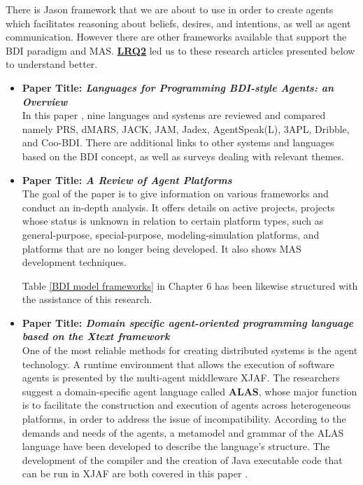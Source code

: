 \vspace{.5cm}

There is Jason framework that we are about to use in order to create agents which facilitates reasoning about beliefs, desires, and intentions, as well as agent communication. However there are other frameworks available that support the \ac{BDI} paradigm and \ac{MAS}. \hyperref[LRQ2.]{\textbf{LRQ2}} led us to these research articles presented below to understand better.

\newpage

\begin{itemize}[label={}]

\item \textbf{Paper Title: \textit{Languages for Programming \ac{BDI}-style Agents: an Overview}}\\

In this paper \cite{9lang}, nine languages and systems are reviewed and compared namely PRS, dMARS, JACK, JAM, Jadex, AgentSpeak(L), 3APL, Dribble, and Coo-\ac{BDI}. There are additional links to other systems and languages based on the \ac{BDI} concept, as well as surveys dealing with relevant themes.

\vspace{.5cm}

\item \textbf{Paper Title: \textit{A Review of Agent Platforms}}\\

The goal of the paper \cite{review} is to give information on various frameworks and conduct an in-depth analysis. It offers details on active projects, projects whose status is unknown in relation to certain platform types, such as general-purpose, special-purpose, modeling-simulation platforms, and platforms that are no longer being developed. It also shows \ac{MAS} development techniques.

\vspace{.5cm}

Table \ref{BDI model frameworks} in Chapter 6 has been likewise structured with the assistance of this research.

\vspace{.5cm}

\item \textbf{Paper Title: \textit{Domain specific agent-oriented programming language based on the Xtext framework}} \\

One of the most reliable methods for creating distributed systems is the agent technology. A runtime environment that allows the execution of software agents is presented by the multi-agent middleware XJAF. The researchers suggest a domain-specific agent language called \textbf{ALAS}, whose major function is to facilitate the construction and execution of agents across heterogeneous platforms, in order to address the issue of incompatibility. According to the demands and needs of the agents, a metamodel and grammar of the ALAS language have been developed to describe the language's structure. The development of the compiler and the creation of Java executable code that can be run in XJAF are both covered in this paper \cite{xtext}.


\end{itemize}
